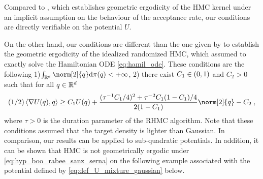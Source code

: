 Compared to \cite{livingstone:betancourt:byrne:girolami:2016}, which
establishes geometric ergodicity of the HMC kernel under an implicit
assumption on the behaviour of the acceptance rate, our conditions are
directly verifiable on the potential $U$.

On the other hand, our conditions are different than the one given by
\cite{bou:sanz:2017} to establish the geometric ergodicity of the
idealized randomized HMC, which assumed to exactly solve the Hamiltonian
ODE \eqref{eq:hamil_ode}. These conditions are the following
1)$\int_{\rset^d} \norm[2]{q} \rmd \pi(q) < \plusinfty$, 2) there
exist $C_1 \in \left(0,1\right)$ and $C_2 >0$ such that for all $q \in \mathbb{R}^d$
\begin{equation}
\label{eq:hyp_boo_rabee_sanz_serna}
  (1/2) \ps{\nabla U(q)}{q} \geq C_1 U(q) + \frac{(\tau^{-1}C_1/4)^2+\tau^{-2}C_1(1-C_1)/4}{2(1-C_1)}\norm[2]{q} -C_2 \eqsp,
\end{equation}
where $\tau>0$ is the duration parameter of the RHMC algorithm.  Note
that these conditions assumed that the target density is lighter than
Gaussian. In comparison, our results can be applied to sub-quadratic
potentials. In addition, it can be shown that HMC is not geometrically
ergodic under \eqref{eq:hyp_boo_rabee_sanz_serna} on the following example associated with the potential defined by  \eqref{eq:def_U_mixture_gaussian} below.

